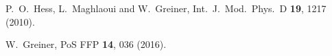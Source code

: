 \documentclass[article,twocolumn]{revtex4}
\begin{document}
\begin{thebibliography}{99}
  P.~O.~Hess, L.~Maghlaoui and W.~Greiner,
  Int.\ J.\ Mod.\ Phys.\ D {\bf 19}, 1217 (2010).

  W.~Greiner,
  PoS FFP {\bf 14}, 036 (2016).
  
\end{thebibliography}
\end{document}
